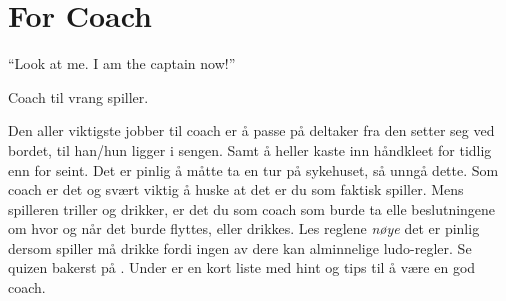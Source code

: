 \documentclass[10pt,a4paper,norsk,openany]{book}
\begin{document}
\chapter{For Coach}

\epigraph{``Look at me. I am the captain now!''}{Coach til vrang spiller.}

Den aller viktigste jobber til coach er å passe på deltaker fra den setter seg
ved bordet, til han/hun ligger i sengen. Samt å heller kaste inn håndkleet for
tidlig enn for seint. Det er pinlig å måtte ta en tur på sykehuset, så unngå
dette. Som coach er det og svært viktig å huske at det er du som faktisk
spiller. Mens spilleren triller og drikker, er det du som coach som burde ta
elle beslutningene om hvor og når det burde flyttes, eller drikkes. Les reglene
\emph{nøye} det er pinlig dersom spiller må drikke fordi ingen av dere kan
alminnelige ludo-regler. Se quizen bakerst på \pageref{chap:quiz}. Under er en
kort liste med hint og tips til å være en god coach.
\end{document}
